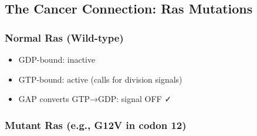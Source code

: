 \begin{Shaded}
\begin{Highlighting}[]
    
\end{Highlighting}
\end{Shaded}

\hypertarget{the-cancer-connection-ras-mutations}{%
\subsection{\texorpdfstring{\textbf{The Cancer Connection: Ras
Mutations}}{The Cancer Connection: Ras Mutations}}\label{the-cancer-connection-ras-mutations}}

\hypertarget{normal-ras-wild-type}{%
\subsubsection{\texorpdfstring{\textbf{Normal Ras}
(Wild-type)}{Normal Ras (Wild-type)}}\label{normal-ras-wild-type}}

\begin{itemize}
\tightlist
\item
  GDP-bound: inactive
\item
  GTP-bound: active (calls for division signals)
\item
  GAP converts GTP→GDP: signal OFF ✓
\end{itemize}

\hypertarget{mutant-ras-e.g.-g12v-in-codon-12}{%
\subsubsection{\texorpdfstring{\textbf{Mutant Ras} (e.g., G12V in codon
12)}{Mutant Ras (e.g., G12V in codon 12)}}\label{mutant-ras-e.g.-g12v-in-codon-12}}

